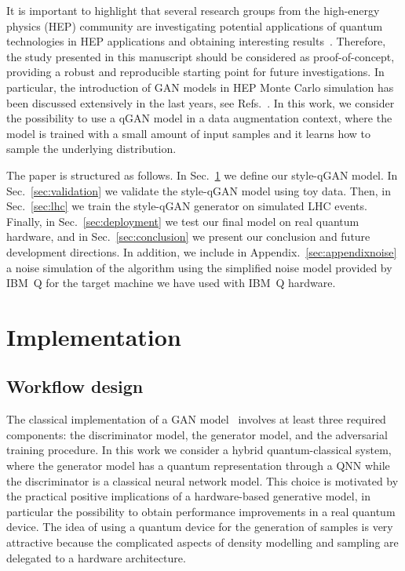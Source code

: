 \documentclass[twocolumn,preprintnumbers,superscriptaddress]{revtex4-2}
\begin{document}
It is important to highlight that several research groups from the high-energy
physics (HEP) community are investigating potential applications of quantum
technologies in HEP applications and obtaining interesting
results~\cite{P_rez_Salinas_2021,Guan_2021,chang2021quantum,Chang_2021,Belis_2021,khattak2021fast}.
Therefore, the study presented in this manuscript should be considered as
proof-of-concept, providing a robust and reproducible starting point for future
investigations. In particular, the introduction of GAN models in HEP Monte Carlo
simulation has been discussed extensively in the last years, see
Refs.~\cite{baldi2021gan,Backes_2021,butter2020generative,Butter_2021,Butter_2020,Bellagente_2020,Butter_2019}.
In this work, we consider the possibility to use a qGAN model in a data
augmentation context, where the model is trained with a small amount of input
samples and it learns how to sample the underlying distribution.

The paper is structured as follows. In Sec.~\ref{sec:implementation} we define our style-qGAN model. In Sec.~\ref{sec:validation} we
validate the style-qGAN model using toy data. Then, in Sec.~\ref{sec:lhc} we train the style-qGAN
generator on simulated LHC events. Finally, in Sec.~\ref{sec:deployment} we test
our final model on real quantum hardware, and in Sec.~\ref{sec:conclusion} we
present our conclusion and future development directions. In addition, we include in Appendix.~\ref{sec:appendixnoise} a noise simulation of the algorithm using the simplified noise model provided by IBM~Q for the target machine we have used with IBM~Q hardware.

\section{Implementation}
\label{sec:implementation}

\subsection{Workflow design}

The classical implementation of a GAN model~\cite{goodfellow2014generative}
involves at least three required components: the discriminator model, the
generator model, and the adversarial training procedure. In this work we
consider a hybrid quantum-classical system, where the generator model has a
quantum representation through a QNN while the
discriminator is a classical neural network model. This choice is motivated by
the practical positive implications of a hardware-based generative model, in
particular the possibility to obtain performance improvements in a real quantum
device. The idea of using a quantum device for the generation of
samples is very attractive because the complicated aspects of density modelling and sampling are delegated to a hardware architecture.
\end{document}

